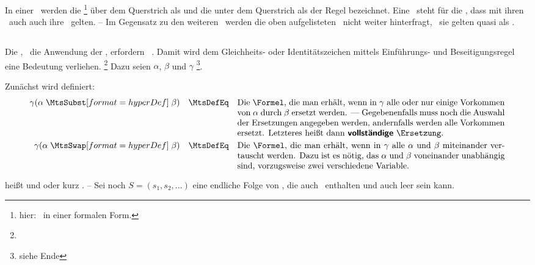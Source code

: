 {In einer \Schlussregel\ werden die \Formeln%
\footnote{hier: \Aussagen\ in einer formalen Form.}
über dem Querstrich als  und die unter dem Querstrich als  der Regel bezeichnet.
Eine \Schlussregel\ steht für die \Aussage, dass mit ihren \Praemissen\ auch auch ihre \Konklusionen\ gelten.
-- Im Gegensatz zu den weiteren \Schlussregeln\ werden die oben aufgelisteten \Basisregeln\ nicht weiter hinterfragt, \textdh\ sie gelten quasi als \Axiome.

\subsection[Identitätsregeln]{\Identitaetsregeln}%
\label                    {sub:Identitaetsregeln}

Die \zulaessigenTransformationen, \textdh\ die Anwendung der \Schlussregeln, erfordern \zulaessige\ \Ersetzungen.
Damit wird dem Gleichheits- oder Identitätszeichen \chrqt{\MtsEq} mittels Einführungs- und Beseitigungsregel eine Bedeutung verliehen.%
\footnote{}
Dazu seien $\alpha$, $\beta$ und $\gamma$ \vergleichbare\footnote{siehe Ende }\Formeln.

Zunächst wird definiert:
\begin{align}
	\gamma(\alpha \defSymBin{\MtsSubst} \beta) \quad \MtsDefEq \quad
	\parbox[t]{11cm}{%
		Die \Formel, die man erhält, wenn in $\gamma$ alle oder nur einige Vorkommen von $\alpha$ durch $\beta$ ersetzt werden.
		--- Gegebenenfalls muss noch die Auswahl der Ersetzungen angegeben werden, andernfalls werden alle Vorkommen ersetzt.
		Letzteres heißt dann \defFt{vollständige} \Ersetzung.
	} \label{def:ErsetzungAlt}\\
	\gamma(\alpha \defSymBin{\MtsSwap} \beta) \quad \MtsDefEq \quad
	\parbox[t]{11cm}{%
		Die \Formel, die man erhält, wenn in $\gamma$ alle $\alpha$ und $\beta$ miteinander vertauscht werden.
		Dazu ist es nötig, das $\alpha$ und $\beta$ voneinander unabhängig sind, vorzugsweise zwei verschiedene Variable.
	} \label{def:Vertauschung}
\end{align}

\seqqt{$ \alpha \MtsSubst \beta $} heißt  und \seqqt{$ \alpha \MtsSwap \beta $}  oder kurz .
-- Sei noch $S = (s_1, s_2, ...)$ eine endliche Folge von \Ersetzungen, die auch \Vertauschungen\ enthalten und auch leer sein kann.

}
